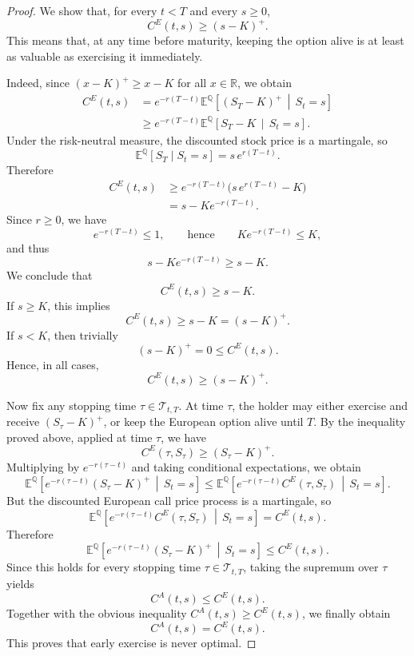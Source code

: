 \documentclass[11pt]{article}
\newcommand{\Qbb}{\mathbb{Q}}
\theoremstyle{definition}
\theoremstyle{plain}
\begin{document}
\begin{proof}
We show that, for every \(t<T\) and every \(s\ge 0\),
\[
C^E(t,s)\ge (s-K)^+.
\]
This means that, at any time before maturity, keeping the option alive
is at least as valuable as exercising it immediately.

\medskip

Indeed, since \((x-K)^+\ge x-K\) for all \(x\in\mathbb R\), we obtain
\begin{align*}
C^E(t,s)
&=
e^{-r(T-t)}
\mathbb E^{\Qbb}\!\left[
(S_T-K)^+
\,\middle|\, S_t=s
\right]
\\
&\ge
e^{-r(T-t)}
\mathbb E^{\Qbb}\!\left[
S_T-K
\,\middle|\, S_t=s
\right].
\end{align*}
Under the risk-neutral measure, the discounted stock price is a
martingale, so
\[
\mathbb E^{\Qbb}[S_T\mid S_t=s]=s\,e^{r(T-t)}.
\]
Therefore
\begin{align*}
C^E(t,s)
&\ge
e^{-r(T-t)}
\big(s\,e^{r(T-t)}-K\big)
\\
&=
s-Ke^{-r(T-t)}.
\end{align*}
Since \(r\ge 0\), we have
\[
e^{-r(T-t)}\le 1,
\qquad\text{hence}\qquad
Ke^{-r(T-t)}\le K,
\]
and thus
\[
s-Ke^{-r(T-t)}\ge s-K.
\]
We conclude that
\[
C^E(t,s)\ge s-K.
\]
If \(s\ge K\), this implies
\[
C^E(t,s)\ge s-K=(s-K)^+.
\]
If \(s<K\), then trivially
\[
(s-K)^+=0\le C^E(t,s).
\]
Hence, in all cases,
\[
C^E(t,s)\ge (s-K)^+.
\]

\medskip

Now fix any stopping time \(\tau\in\mathcal T_{t,T}\).
At time \(\tau\), the holder may either exercise and receive
\((S_\tau-K)^+\), or keep the European option alive until \(T\).
By the inequality proved above, applied at time \(\tau\), we have
\[
C^E(\tau,S_\tau)\ge (S_\tau-K)^+.
\]
Multiplying by \(e^{-r(\tau-t)}\) and taking conditional expectations,
we obtain
\[
\mathbb E^{\Qbb}\!\left[
e^{-r(\tau-t)}(S_\tau-K)^+
\,\middle|\, S_t=s
\right]
\le
\mathbb E^{\Qbb}\!\left[
e^{-r(\tau-t)} C^E(\tau,S_\tau)
\,\middle|\, S_t=s
\right].
\]
But the discounted European call price process is a martingale, so
\[
\mathbb E^{\Qbb}\!\left[
e^{-r(\tau-t)} C^E(\tau,S_\tau)
\,\middle|\, S_t=s
\right]
=
C^E(t,s).
\]
Therefore
\[
\mathbb E^{\Qbb}\!\left[
e^{-r(\tau-t)}(S_\tau-K)^+
\,\middle|\, S_t=s
\right]
\le
C^E(t,s).
\]
Since this holds for every stopping time \(\tau\in\mathcal T_{t,T}\),
taking the supremum over \(\tau\) yields
\[
C^A(t,s)\le C^E(t,s).
\]
Together with the obvious inequality \(C^A(t,s)\ge C^E(t,s)\), we
finally obtain
\[
C^A(t,s)=C^E(t,s).
\]
This proves that early exercise is never optimal.
\end{proof}
\end{document}
